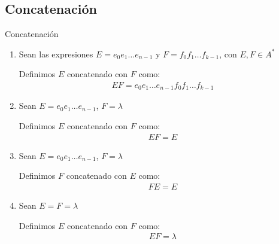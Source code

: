 \subsection{Concatenación}

\begin{definicion}{Concatenación}{}
    \begin{center}
        \begin{enumerate}[%
                        labelindent=*,
                        style=multiline,
                        leftmargin=*,
                        align=left,
                        leftmargin=2\parindent,
                        label=Caso \arabic*)]
            \item Sean las expresiones $E = e_0 e_1 \dots e_{n-1}$ 
                y 
        $F = f_0 f_1 \dots f_{k-1}$, con $E, F \in A^{*}$

        \medskip

        Definimos $E$ concatenado con $F$ como:
        \begin{gather*}
            EF = e_0 e_1 \dots e_{n-1} f_0 f_1 \dots f_{k-1}
        \end{gather*}

            \item Sean $E = e_0 e_1 \dots e_{n-1}$, $F = \lambda$

                \medskip
                Definimos $E$ concatenado con $F$ como:
                \begin{gather*}
                    EF = E
                \end{gather*}
            \item Sean $E = e_0 e_1 \dots e_{n-1}$, $F = \lambda$
                
                \medskip
                Definimos $F$ concatenado con $E$ como:
                \begin{gather*}
                    FE = E
                \end{gather*}
            \item Sean $E = F = \lambda$

                \medskip
                Definimos $E$ concatenado con $F$ como:
                \begin{gather*}
                    EF = \lambda
                \end{gather*}
        \end{enumerate}
    \end{center}
\end{definicion}

